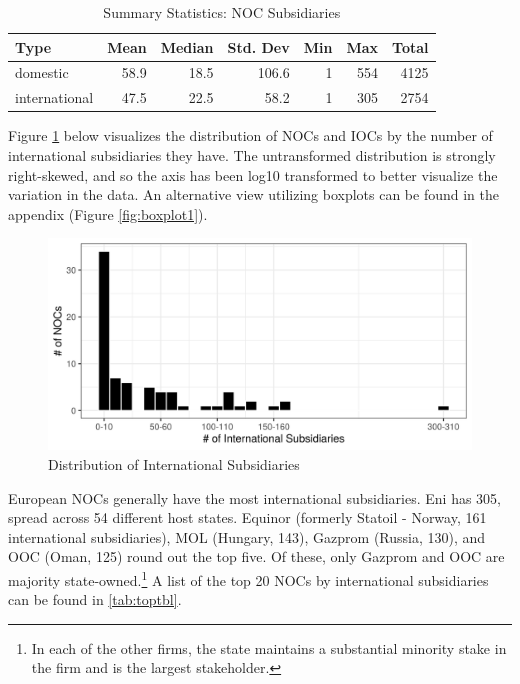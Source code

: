 \documentclass[11pt,]{book}
\begin{document}
\begin{table}

\caption{\label{tab:sumstats}Summary Statistics: NOC Subsidiaries}
\centering
\begin{tabular}[t]{lrrrrrr}
\toprule
\textbf{Type} & \textbf{Mean} & \textbf{Median} & \textbf{Std. Dev} & \textbf{Min} & \textbf{Max} & \textbf{Total}\\
\midrule
domestic & 58.9 & 18.5 & 106.6 & 1 & 554 & 4125\\
international & 47.5 & 22.5 & 58.2 & 1 & 305 & 2754\\
\bottomrule
\end{tabular}
\end{table}

Figure \ref{fig:distributions} below visualizes the distribution of NOCs and IOCs by the number of international subsidiaries they have. The untransformed distribution is strongly right-skewed, and so the axis has been log10 transformed to better visualize the variation in the data. An alternative view utilizing boxplots can be found in the appendix (Figure \ref{fig:boxplot1}).

\begin{figure}

{\centering \includegraphics[width=0.8\linewidth]{finalfig/distributions-1} 

}

\caption{Distribution of International Subsidiaries}\label{fig:distributions}
\end{figure}

European NOCs generally have the most international subsidiaries. Eni has 305, spread across 54 different host states. Equinor (formerly Statoil - Norway, 161 international subsidiaries), MOL (Hungary, 143), Gazprom (Russia, 130), and OOC (Oman, 125) round out the top five. Of these, only Gazprom and OOC are majority state-owned.\footnote{In each of the other firms, the state maintains a substantial minority stake in the firm and is the largest stakeholder.} A list of the top 20 NOCs by international subsidiaries can be found in \ref{tab:toptbl}.
\end{document}
